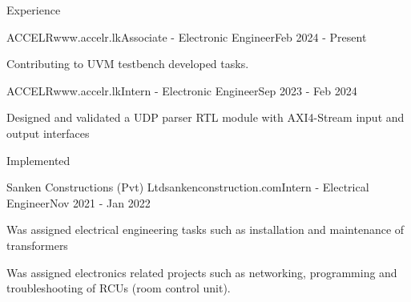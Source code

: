 \documentclass[
	11pt, %
]{./assets/resume} %
\begin{document}

\begin{rSection}{Experience}

	\begin{rSubsectionX}{ACCELR}{www.accelr.lk}{Associate - Electronic Engineer}{Feb 2024 - Present}
		\item Contributing to UVM testbench developed tasks.
	\end{rSubsectionX}

	\begin{rSubsectionX}{ACCELR}{www.accelr.lk}{Intern - Electronic Engineer}{Sep 2023 - Feb 2024}
		\item Designed and validated a UDP parser RTL module with AXI4-Stream input and output interfaces
		\item Implemented 
	\end{rSubsectionX}

	\begin{rSubsectionX}{Sanken Constructions (Pvt) Ltd}{sankenconstruction.com}{Intern - Electrical Engineer}{Nov 2021 - Jan 2022}
		\item Was assigned electrical engineering tasks such as installation and maintenance of transformers
		\item Was assigned electronics related projects such as networking, programming and troubleshooting of RCUs (room control unit).
	\end{rSubsectionX}

\end{rSection}

\end{document}
